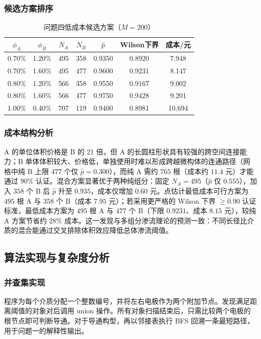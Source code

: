 \documentclass[12pt,a4paper,fontset=windows]{ctexart}
\begin{document}
\subsubsection{候选方案排序}
\begin{table}[H]\centering\caption{问题四低成本候选方案（$M=200$）}\label{tab:q4candidates}\begin{tabular}{ccccccc}\toprule $\phi_A$&$\phi_B$&$N_A$&$N_B$&$\hat p$&Wilson下界&成本/元\\\midrule 0.70\%&1.20\%&495&358&0.9350&0.8920&7.948\\0.70\%&1.60\%&495&477&0.9600&0.9231&8.147\\0.80\%&1.20\%&566&358&0.9550&0.9167&9.002\\0.80\%&1.60\%&566&477&0.9750&0.9428&9.201\\1.00\%&0.40\%&707&119&0.9400&0.8981&10.694\\\bottomrule\end{tabular}\end{table}

\subsubsection{成本结构分析}
A 的单位体积价格是 B 的 21 倍，但 A 的长圆柱形状具有较强的跨空间连接能力；B 单体体积较大、价格低，单独使用时难以形成跨越微构体的连通路径（网格中纯 B 上限 $477$ 个仅 $\hat p=0.300$），而纯 A 需约 $765$ 根（成本约 $11.4$ 元）才能通过 $90\%$ 认证。混合方案显著优于两种纯组分：固定 $N_A=495$（$\hat p$ 仅 $0.555$），加入 $358$ 个 B 后 $\hat p$ 升至 $0.935$，成本仅增加 $0.60$ 元。点估计最低成本可行方案为 $495$ 根 A 与 $358$ 个 B（成本 $7.95$ 元）；若采用更严格的 Wilson 下界 $\ge 0.90$ 认证标准，最低成本方案为 $495$ 根 A 与 $477$ 个 B（下限 $0.9231$、成本 $8.15$ 元），较纯 A 方案节省约 $28\%$ 成本。这一发现与多组分渗流理论的预测一致\cite{maiti2018}：不同长径比介质的混合能通过交叉排除体积效应降低总体渗流阈值。

\subsection{算法实现与复杂度分析}

\subsubsection{并查集实现}
程序为每个介质分配一个整数编号，并将左右电极作为两个附加节点。发现满足距离阈值的对象对后调用 union 操作。所有对象扫描结束后，只需比较两个电极的根节点即可判断导通。对于导通构型，再以邻接表执行 BFS 回溯一条最短路径，用于问题一的解释性输出。
\end{document}
